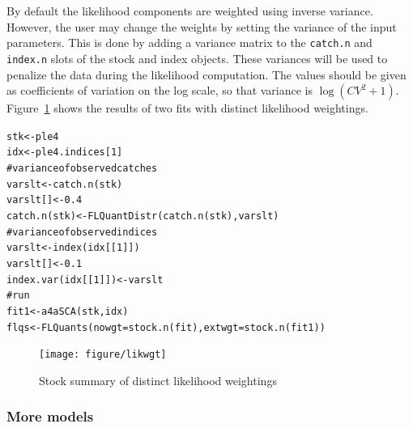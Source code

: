 \documentclass[a4paper,english,10pt]{article}\usepackage[]{graphicx}\usepackage[]{color}
\makeatletter
\newcommand{\hlnum}[1]{\textcolor[rgb]{0.2,0.2,0.2}{#1}}%
\newcommand{\hlcom}[1]{\textcolor[rgb]{0.2,0.267,0.4}{#1}}%
\newcommand{\hlstd}[1]{\textcolor[rgb]{0,0,0}{#1}}%
\newcommand{\hlkwb}[1]{\textcolor[rgb]{0.361,0.506,0.596}{#1}}%
\newcommand{\hlkwc}[1]{\textcolor[rgb]{0.361,0.506,0.596}{#1}}%
\newcommand{\hlkwd}[1]{\textcolor[rgb]{0.361,0.506,0.596}{#1}}%
\newenvironment{kframe}{%
 \def\at@end@of@kframe{}%
 \ifinner\ifhmode%
  \def\at@end@of@kframe{\end{minipage}}%
  \begin{minipage}{\columnwidth}%
 \fi\fi%
 \def\FrameCommand##1{\hskip\@totalleftmargin \hskip-\fboxsep
 \colorbox{shadecolor}{##1}\hskip-\fboxsep
     \hskip-\linewidth \hskip-\@totalleftmargin \hskip\columnwidth}%
 \MakeFramed {\advance\hsize-\width
   \@totalleftmargin\z@ \linewidth\hsize
   \@setminipage}}%
 {\par\unskip\endMakeFramed%
 \at@end@of@kframe}
\newenvironment{knitrout}{}{} %
\newcommand{\code}[1]{{\texttt{#1}}}
\makeatother
\begin{document}
By default the likelihood components are weighted using inverse variance. However, the user may change the weights by setting the variance of the input parameters. This is done by adding a variance matrix to the \code{catch.n} and \code{index.n} slots of the stock and index objects. These variances will be used to penalize the data during the likelihood computation. The values should be given as coefficients of variation on the log scale, so that variance is $\log{({CV}^2 + 1)}$. Figure~\ref{fig:likwgt} shows the results of two fits with distinct likelihood weightings.

\begin{knitrout}
\color{fgcolor}\begin{kframe}
\begin{alltt}
\hlstd{stk} \hlkwb{<-} \hlstd{ple4}
\hlstd{idx} \hlkwb{<-} \hlstd{ple4.indices[}\hlnum{1}\hlstd{]}
\hlcom{# variance of observed catches}
\hlstd{varslt} \hlkwb{<-} \hlkwd{catch.n}\hlstd{(stk)}
\hlstd{varslt[]} \hlkwb{<-} \hlnum{0.4}
\hlkwd{catch.n}\hlstd{(stk)} \hlkwb{<-} \hlkwd{FLQuantDistr}\hlstd{(}\hlkwd{catch.n}\hlstd{(stk), varslt)}
\hlcom{# variance of observed indices}
\hlstd{varslt} \hlkwb{<-} \hlkwd{index}\hlstd{(idx[[}\hlnum{1}\hlstd{]])}
\hlstd{varslt[]} \hlkwb{<-} \hlnum{0.1}
\hlkwd{index.var}\hlstd{(idx[[}\hlnum{1}\hlstd{]])} \hlkwb{<-} \hlstd{varslt}
\hlcom{# run}
\hlstd{fit1} \hlkwb{<-} \hlkwd{a4aSCA}\hlstd{(stk, idx)}
\hlstd{flqs} \hlkwb{<-} \hlkwd{FLQuants}\hlstd{(}\hlkwc{nowgt}\hlstd{=}\hlkwd{stock.n}\hlstd{(fit),} \hlkwc{extwgt}\hlstd{=}\hlkwd{stock.n}\hlstd{(fit1))}
\end{alltt}
\end{kframe}
\end{knitrout}

\begin{knitrout}
\color{fgcolor}\begin{figure}[H]


{\centering \texttt{[image: figure/likwgt]} 

}

\caption[Stock summary of distinct likelihood weightings]{Stock summary of distinct likelihood weightings\label{fig:likwgt}}
\end{figure}


\end{knitrout}

\subsubsection{More models}
\end{document}
